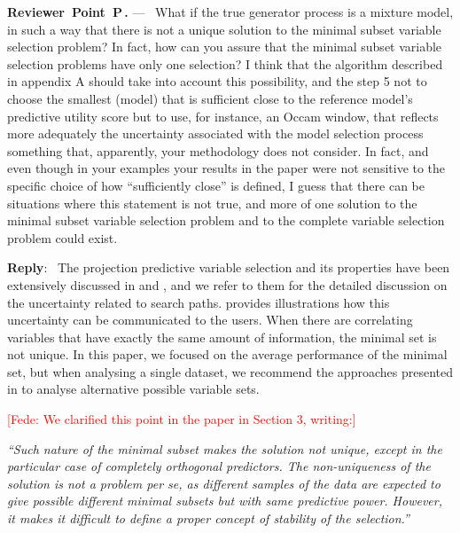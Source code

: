 \documentclass[11pt]{article}
\newcounter{reviewer}
\newcounter{point}[reviewer]
\renewcommand{\thepoint}{P\,\thereviewer.\arabic{point}}
\newenvironment{point}
   {\refstepcounter{point} \bigskip \noindent \begin{sf}{\textbf{Reviewer~Point~\thepoint} } ---\ }
   {\par \end{sf}}
\newenvironment{reply}
   {\medskip \noindent \textbf{Reply}:\  }
   {\medskip}
\newcommand{\fede}[1]{\textcolor{red}{[Fede: #1]}}
\begin{document}
\begin{point}
What if the true generator process is a mixture model, in such a way that there is not a unique solution to the minimal subset variable selection problem? In fact, how can you assure that the minimal subset variable selection problems have only one selection? I think that the algorithm described in appendix A should take into account this possibility, and the step 5 not to choose the smallest (model) that is sufficient close to the reference model's predictive utility score but to use, for instance, an Occam window, that reflects more adequately the uncertainty associated with the model selection process something that, apparently, your methodology does not consider. In fact, and even though in your examples your results in the paper were not sensitive to the specific choice of how “sufficiently close” is defined, I guess that there can be situations where this statement is not true, and more of one solution to the minimal subset variable selection problem and to the complete variable selection problem could exist.
\end{point}

\begin{reply}
The projection predictive variable selection and its properties have been extensively discussed in \citet{piironen2017comparison} and \citet{piironen2020projective}, and we refer to them for the detailed discussion on the uncertainty related to search paths. \citet{paasiniemi2018} provides illustrations how this uncertainty can be communicated to the users. When there are correlating variables that have exactly the same amount of information, the minimal set is not unique. In this paper, we focused on the average performance of the minimal set, but when analysing a single dataset, we recommend the approaches presented in \citet{paasiniemi2018} to analyse alternative possible variable sets.

\fede{We clarified this point in the paper in Section 3, writing:}

\vspace{0.5cm}

\textit{``Such nature of the minimal subset makes the solution
	not unique, except in the particular case of completely orthogonal predictors. 
	The non-uniqueness of the solution is not a problem per se, as different samples of the data
	are expected to give possible different minimal subsets but with same predictive power. 
	However, it makes it difficult to define a proper
	concept of stability of the selection.''}
\end{reply}
\end{document}
